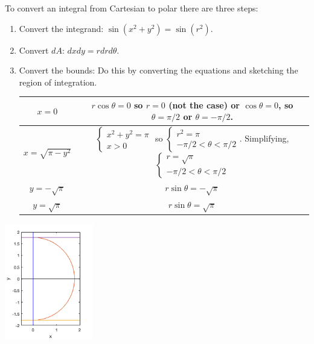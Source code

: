 \documentclass[12pt,letterpaper,noanswers]{exam}
\begin{document}
To convert an integral from Cartesian to polar there are three steps:
\begin{enumerate}
    \item Convert the integrand: $\sin(x^2+y^2) = \sin(r^2)$.
    \item Convert $dA$:  $dxdy = rdrd\theta$.
    \item Convert the bounds:  Do this by converting the equations and sketching the region of integration.
    
    \begin{tabular}{| c c |}
        \hline
    $x = 0$ & $r\cos\theta = 0$ so $r = 0$ (not the case) or $\cos\theta = 0$, so $\theta = \pi/2$ or $\theta = -\pi/2$.\\
    \hline
    $x = \sqrt{\pi-y^2}$ & $\left\{\begin{array}{c} x^2+y^2 = \pi \\ x>0 \end{array}\right.$ so $\left\{\begin{array}{c}r^2 = \pi \\ -\pi/2<\theta<\pi/2\end{array}\right.$.  Simplifying,  $\left\{\begin{array}{c}r = \sqrt{\pi} \\ -\pi/2<\theta<\pi/2\end{array}\right.$\\
        \hline
    $y = -\sqrt{\pi}$ & $r\sin\theta = -\sqrt{\pi}$ \\
        \hline
    $y = \sqrt{\pi}$ & $r\sin\theta = \sqrt{\pi}$ \\
        \hline
    \end{tabular}
\end{enumerate}

\includegraphics[height=2in]{img/C12-2dpolar.png}

 
\end{document}
